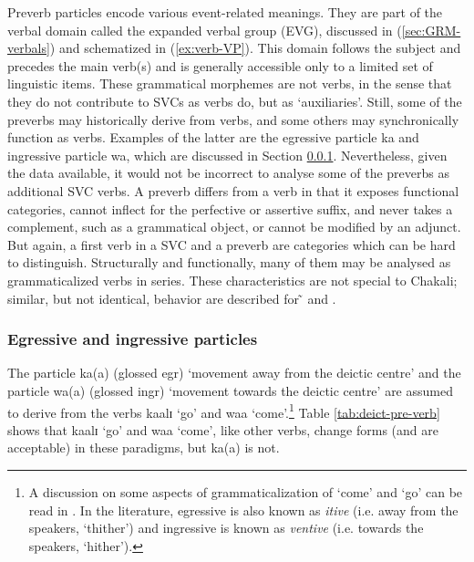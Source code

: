 \begin{exe}
\begin{exe}
\begin{exe}
\begin{exe}
\begin{exe}
\begin{exe}
\begin{exe}
\begin{exe}
\begin{exe}
\begin{exe}
\begin{exe}
Preverb  particles  encode various event-related meanings. They are part of the verbal domain  called the expanded verbal group (EVG), discussed in (\ref{sec:GRM-verbals}) and schematized in  (\ref{ex:verb-VP}). This domain  follows the subject and precedes the main verb(s) and is generally accessible  only to a limited set of linguistic items. These grammatical morphemes are not verbs, in the sense that they do not contribute to SVCs as verbs do,  but as `auxiliaries'. Still,  some of the preverbs may historically derive from verbs, and  some others may synchronically function as verbs.  Examples of the latter are the egressive particle {\sls ka} and ingressive particle {\sls wa},  which are discussed in Section \ref{sec:GRM-EVC-egr-ingr}. Nevertheless, given the data available,  it would not be incorrect to analyse some of the preverbs  as additional SVC verbs.  A preverb differs from a verb in that it exposes functional categories,  cannot inflect for the perfective or assertive suffix,  and never takes  a complement, such as a grammatical object, or cannot be modified by  an adjunct.  But again,  a first verb in a SVC and a preverb are categories which can be hard to distinguish. Structurally and functionally, many of them may be analysed as grammaticalized verbs in series. These characteristics are not special to Chakali; similar, but not identical, behavior are described for ̃ and  \citep{Daku07b, Daku08}.


\subsubsection{Egressive and ingressive particles}
\label{sec:GRM-EVC-egr-ingr}


The  particle {\sls ka(a)} (glossed {\sc egr})   `movement away from the deictic centre'  and   the  particle {\sls wa(a)} (glossed {\sc ingr})  `movement towards the deictic centre' are  assumed to derive from the  verbs {\sls kaalɪ} `go' and  {\sls waa} `come'.\footnote{A discussion on some aspects of grammaticalization of  `come' and `go' can be read in  \citet{Bour92}. In the literature, egressive  is also known as  {\it itive} (i.e. away from the speakers,  `thither')  and  ingressive  is  known as {\it ventive} (i.e. towards the speakers,   `hither'). }  Table \ref{tab:deict-pre-verb} shows that  {\sls kaalɪ} `go' and {\sls waa} `come',  like other verbs, change forms (and are acceptable) in these paradigms,  but {\sls ka(a)}  is  not.



\end{exe}
\end{exe}
\end{exe}
\end{exe}
\end{exe}
\end{exe}
\end{exe}
\end{exe}
\end{exe}
\end{exe}
\end{exe}
